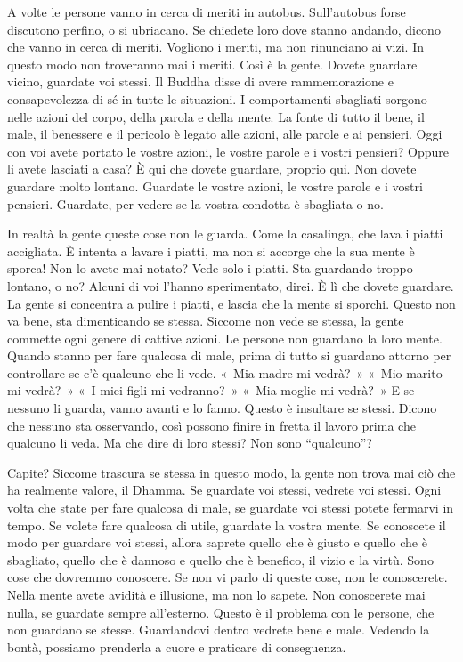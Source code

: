 A volte le persone vanno in cerca di meriti in autobus. Sull'autobus
forse discutono perfino, o si ubriacano. Se chiedete loro dove stanno
andando, dicono che vanno in cerca di meriti. Vogliono i meriti, ma non
rinunciano ai vizi. In questo modo non troveranno mai i meriti. Così è
la gente. Dovete guardare vicino, guardate voi stessi. Il Buddha disse
di avere rammemorazione e consapevolezza di sé in tutte le situazioni. I
comportamenti sbagliati sorgono nelle azioni del corpo, della parola e
della mente. La fonte di tutto il bene, il male, il benessere e il
pericolo è legato alle azioni, alle parole e ai pensieri. Oggi con voi
avete portato le vostre azioni, le vostre parole e i vostri pensieri?
Oppure li avete lasciati a casa? È qui che dovete guardare, proprio qui.
Non dovete guardare molto lontano. Guardate le vostre azioni, le vostre
parole e i vostri pensieri. Guardate, per vedere se la vostra condotta è
sbagliata o no.

In realtà la gente queste cose non le guarda. Come la casalinga, che
lava i piatti accigliata. È intenta a lavare i piatti, ma non si accorge
che la sua mente è sporca! Non lo avete mai notato? Vede solo i piatti.
Sta guardando troppo lontano, o no? Alcuni di voi l'hanno sperimentato,
direi. È lì che dovete guardare. La gente si concentra a pulire i
piatti, e lascia che la mente si sporchi. Questo non va bene, sta
dimenticando se stessa. Siccome non vede se stessa, la gente commette
ogni genere di cattive azioni. Le persone non guardano la loro mente.
Quando stanno per fare qualcosa di male, prima di tutto si guardano
attorno per controllare se c'è qualcuno che li vede. «~Mia madre mi
vedrà?~» «~Mio marito mi vedrà?~» «~I miei figli mi vedranno?~» «~Mia
moglie mi vedrà?~» E se nessuno li guarda, vanno avanti e lo fanno.
Questo è insultare se stessi. Dicono che nessuno sta osservando, così
possono finire in fretta il lavoro prima che qualcuno li veda. Ma che
dire di loro stessi? Non sono ``qualcuno''?

Capite? Siccome trascura se stessa in questo modo, la gente non trova
mai ciò che ha realmente valore, il Dhamma. Se guardate voi stessi,
vedrete voi stessi. Ogni volta che state per fare qualcosa di male, se
guardate voi stessi potete fermarvi in tempo. Se volete fare qualcosa di
utile, guardate la vostra mente. Se conoscete il modo per guardare voi
stessi, allora saprete quello che è giusto e quello che è sbagliato,
quello che è dannoso e quello che è benefico, il vizio e la virtù. Sono
cose che dovremmo conoscere. Se non vi parlo di queste cose, non le
conoscerete. Nella mente avete avidità e illusione, ma non lo sapete.
Non conoscerete mai nulla, se guardate sempre all'esterno. Questo è il
problema con le persone, che non guardano se stesse. Guardandovi dentro
vedrete bene e male. Vedendo la bontà, possiamo prenderla a cuore e
praticare di conseguenza.


